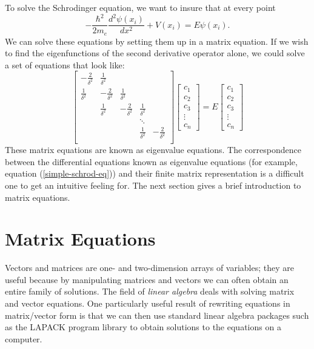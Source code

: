 To solve the Schrodinger equation, we want to insure that at every
point
\begin{equation}
  -\frac{\hbar^2}{2m_e}\frac{d^2\psi(x_i)}{dx^2} + V(x_i) =
   E\psi(x_i).
\label{finite-schrod}
\end{equation}	
We can solve these equations by setting them up in a matrix
equation. If we wish to find the eigenfunctions of the second
derivative operator alone, we could solve a set of equations that look
like: 
\begin{equation}
  \left[\begin{array}{ccccc}
    -\frac{2}{\delta^2}&\frac{1}{\delta^2}&&&\\
    \frac{1}{\delta^2}&-\frac{2}{\delta^2}&\frac{1}{\delta^2}&&\\
     &\frac{1}{\delta^2}&-\frac{2}{\delta^2}&\frac{1}{\delta^2}&\\
     &&&\ddots&\\
     &&&\frac{1}{\delta^2}&-\frac{2}{\delta^2}\\   
  \end{array}\right]
  \left[\begin{array}{c}
  c_1\\c_2\\c_3\\\vdots\\c_n
  \end{array}\right]
  = E
  \left[\begin{array}{c}
  c_1\\c_2\\c_3\\\vdots\\c_n
  \end{array}\right]
\label{lapl-mat}
\end{equation}
These matrix equations are known as eigenvalue equations. The
correspondence between the differential equations known as eigenvalue
equations (for example, equation (\ref{simple-schrod-eq})) and their
finite matrix representation is a difficult one to get an intuitive
feeling for. The next section gives a brief introduction to matrix
equations. 

\section{Matrix Equations}
Vectors and matrices are one- and two-dimension arrays of
variables; they are useful because by manipulating matrices and
vectors we can often obtain an entire family of solutions. The field
of \emph{linear algebra} deals with solving matrix and vector
equations. One particularly useful result of rewriting equations in
matrix/vector form is that we can then use standard linear algebra
packages such as the LAPACK program library \cite{laug} to obtain
solutions to the equations on a computer.

